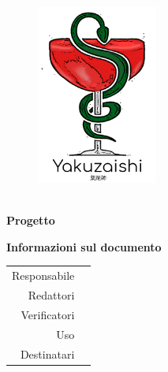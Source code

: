 \thispagestyle{empty}

\begin{figure}
	\centering
	\includegraphics[width=150px]{../template/images/logo}
\end{figure}

\hspace{5pt}

\begin{center}
	\textbf{\Large \documentName}\\[0.2cm]
	\textbf{\Large Progetto \projectName}
\end{center}

\vspace{5pt}

\begin{center}
	\groupEmail
\end{center}

\vspace{5pt}

\begin{center}
	\textbf{Informazioni sul documento}
\end{center}

\begin{table}[H]
	\centering
	\renewcommand{\arraystretch}{1.4}
	\begin{tabular}{r|l}
		Responsabile & \documentApprovers\vspace{2.5pt}\\
		Redattori & \documentEditors\vspace{2.5pt}\\
		Verificatori & \documentVerifiers\vspace{2.5pt}\\
		Uso & \documentUsage\vspace{2.5pt}\\
		Destinatari & \documentAddressee\\
	\end{tabular}
\end{table}

